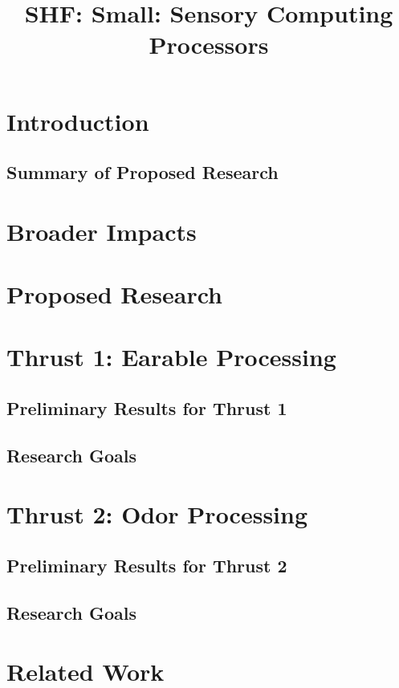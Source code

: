 \documentclass[11 pt]{article}
\title{SHF: Small: Sensory Computing Processors}
\begin{document}
\maketitle
\section{Introduction}


\subsection{Summary of Proposed Research}
\label{ssec:summary}


\section{Broader Impacts}


\section{Proposed Research}


\section{Thrust 1: Earable Processing}
\label{sec:tract1}
\subsection{Preliminary Results for Thrust 1}
\label{ssec:prelim1}

\subsection{Research Goals}
\label{ssec:research1}


\section{Thrust 2: Odor Processing}
\label{sec:tract2}
\subsection{Preliminary Results for Thrust 2}
\label{ssec:prelim2}

\subsection{Research Goals}
\label{ssec:research2}


\section{Related Work}

\end{document}
